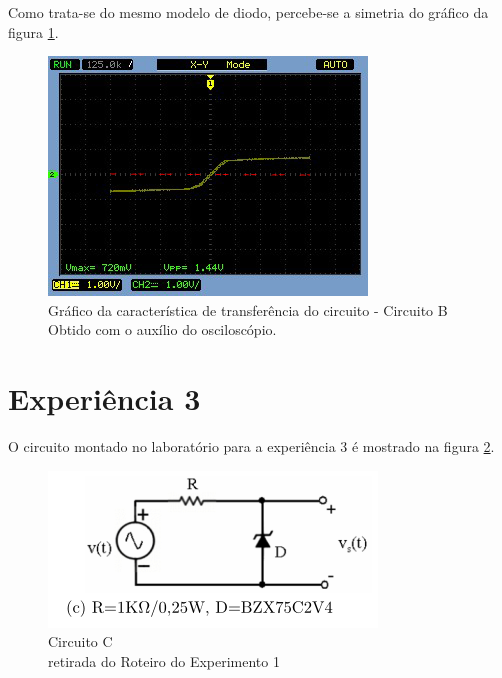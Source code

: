 \documentclass[10pt, final, a4paper]{IEEEtran} %
\begin{document}
Como trata-se do mesmo modelo de diodo, percebe-se a simetria do gráfico da figura \ref{b02}. 

\begin{figure}[ht!]
	\captionsetup{justification=centering}
	\centering
	\includegraphics[width=0.8\linewidth]{imagens/circuitos_resp/b02.jpg}
	\caption{Gráfico da característica de transferência do circuito - Circuito B\\ Obtido com o auxílio do osciloscópio.}
	\label{b02}
\end{figure}
\FloatBarrier

\section{Experiência 3}

O circuito montado no laboratório para a experiência 3 é mostrado na figura \ref{cc}.

\begin{figure}[ht!]
	\captionsetup{justification=centering}
	\centering
	\includegraphics[width=0.8\linewidth]{imagens/circuitos_rel/cc.png}
	\caption{Circuito C\\ retirada do Roteiro do Experimento 1}
	\label{cc}
\end{figure}
\FloatBarrier
\end{document}

